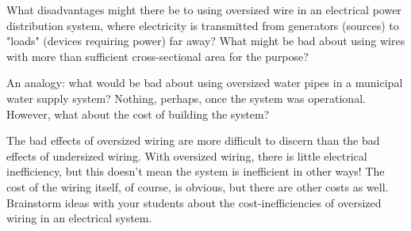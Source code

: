 

What disadvantages might there be to using oversized wire in an electrical power distribution system, where electricity is transmitted from generators (sources) to "loads" (devices requiring power) far away?  What might be bad about using wires with more than sufficient cross-sectional area for the purpose?







An analogy: what would be bad about using oversized water pipes in a municipal water supply system?  Nothing, perhaps, once the system was operational.  However, what about the cost of building the system?







The bad effects of oversized wiring are more difficult to discern than the bad effects of undersized wiring.  With oversized wiring, there is little electrical inefficiency, but this doesn't mean the system is inefficient in other ways!  The cost of the wiring itself, of course, is obvious, but there are other costs as well.  Brainstorm ideas with your students about the cost-inefficiencies of oversized wiring in an electrical system.




